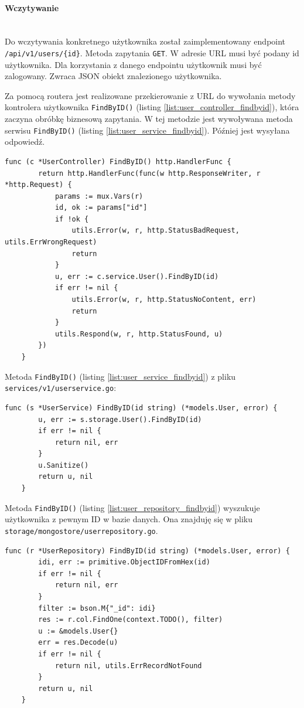 % 
\paragraph{Wczytywanie}\mbox{}\\
Do wczytywania konkretnego użytkownika został zaimplementowany endpoint \texttt{/api/v1/users/\{id\}}.
Metoda zapytania \texttt{GET}.
W adresie URL musi być podany id użytkownika.
Dla korzystania z danego endpointu użytkownik musi być zalogowany.
Zwraca JSON obiekt znalezionego użytkownika.

Za pomocą routera jest realizowane przekierowanie z URL do wywołania metody kontrolera użytkownika \texttt{FindByID()} (listing \ref{list:user_controller_findbyid}), która zaczyna obróbkę biznesową zapytania.
W tej metodzie jest wywoływana metoda serwisu \texttt{FindByID()} (listing \ref{list:user_service_findbyid}). Później jest wysyłana odpowiedź.
\begin{lstlisting}[label=list:user_controller_findbyid,caption=Kontroler wczytywania użytkownika,basicstyle=\tiny\ttfamily]
    func (c *UserController) FindByID() http.HandlerFunc {
        return http.HandlerFunc(func(w http.ResponseWriter, r *http.Request) {
            params := mux.Vars(r)
            id, ok := params["id"]
            if !ok {
                utils.Error(w, r, http.StatusBadRequest, utils.ErrWrongRequest)
                return
            }
            u, err := c.service.User().FindByID(id)
            if err != nil {
                utils.Error(w, r, http.StatusNoContent, err)
                return
            }
            utils.Respond(w, r, http.StatusFound, u)
        })
    }
\end{lstlisting}
% 
Metoda \texttt{FindByID()} (listing \ref{list:user_service_findbyid}) z pliku \texttt{services/v1/userservice.go}:
\begin{lstlisting}[label=list:user_service_findbyid,caption=Serwis wczytywania użytkownika,basicstyle=\tiny\ttfamily]
    func (s *UserService) FindByID(id string) (*models.User, error) {
        u, err := s.storage.User().FindByID(id)
        if err != nil {
            return nil, err
        }
        u.Sanitize()
        return u, nil
    }
\end{lstlisting}
% 
Metoda \texttt{FindByID()} (listing \ref{list:user_repository_findbyid}) wyszukuje użytkownika z pewnym ID w bazie danych.
Ona znajduję się w pliku \texttt{storage/mongostore/userrepository.go}.
\begin{lstlisting}[label=list:user_repository_findbyid,caption=Wczytywanie uzytkownika z bazy danych,basicstyle=\tiny\ttfamily]
    func (r *UserRepository) FindByID(id string) (*models.User, error) {
        idi, err := primitive.ObjectIDFromHex(id)
        if err != nil {
            return nil, err
        }
        filter := bson.M{"_id": idi}
        res := r.col.FindOne(context.TODO(), filter)
        u := &models.User{}
        err = res.Decode(u)
        if err != nil {
            return nil, utils.ErrRecordNotFound
        }
        return u, nil
    }
\end{lstlisting}

